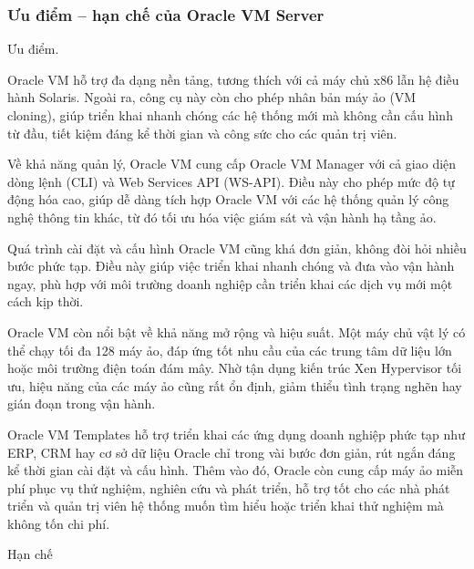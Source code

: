 \subsubsection{Ưu điểm – hạn chế của Oracle VM Server}
\begin{myitem}
\item Ưu điểm.

  \begin{mysubitem}
    \item Oracle VM hỗ trợ đa dạng nền tảng, tương thích với cả máy chủ x86 lẫn hệ điều hành Solaris. Ngoài ra, công cụ này còn cho phép nhân bản máy ảo (VM cloning), giúp triển khai nhanh chóng các hệ thống mới mà không cần cấu hình từ đầu, tiết kiệm đáng kể thời gian và công sức cho các quản trị viên.
    
    \item Về khả năng quản lý, Oracle VM cung cấp Oracle VM Manager với cả giao diện dòng lệnh (CLI) và Web Services API (WS-API). Điều này cho phép mức độ tự động hóa cao, giúp dễ dàng tích hợp Oracle VM với các hệ thống quản lý công nghệ thông tin khác, từ đó tối ưu hóa việc giám sát và vận hành hạ tầng ảo.
    
    \item Quá trình cài đặt và cấu hình Oracle VM cũng khá đơn giản, không đòi hỏi nhiều bước phức tạp. Điều này giúp việc triển khai nhanh chóng và đưa vào vận hành ngay, phù hợp với môi trường doanh nghiệp cần triển khai các dịch vụ mới một cách kịp thời.
    
    \item Oracle VM còn nổi bật về khả năng mở rộng và hiệu suất. Một máy chủ vật lý có thể chạy tối đa 128 máy ảo, đáp ứng tốt nhu cầu của các trung tâm dữ liệu lớn hoặc môi trường điện toán đám mây. Nhờ tận dụng kiến trúc Xen Hypervisor tối ưu, hiệu năng của các máy ảo cũng rất ổn định, giảm thiểu tình trạng nghẽn hay gián đoạn trong vận hành.
    
    \item Oracle VM Templates hỗ trợ triển khai các ứng dụng doanh nghiệp phức tạp như ERP, CRM hay cơ sở dữ liệu Oracle chỉ trong vài bước đơn giản, rút ngắn đáng kể thời gian cài đặt và cấu hình. Thêm vào đó, Oracle còn cung cấp máy ảo miễn phí phục vụ thử nghiệm, nghiên cứu và phát triển, hỗ trợ tốt cho các nhà phát triển và quản trị viên hệ thống muốn tìm hiểu hoặc triển khai thử nghiệm mà không tốn chi phí.

  \end{mysubitem}

\item Hạn chế


\end{myitem}
